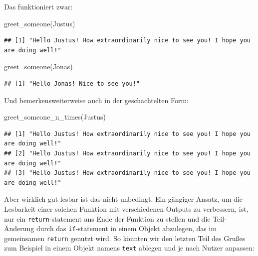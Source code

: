 \documentclass[
]{book}
\newenvironment{Shaded}{\begin{snugshade}}{\end{snugshade}}
\newcommand{\FunctionTok}[1]{\textcolor[rgb]{0.00,0.00,0.00}{#1}}
\newcommand{\NormalTok}[1]{#1}
\newcommand{\StringTok}[1]{\textcolor[rgb]{0.31,0.60,0.02}{#1}}
\begin{document}
Das funktioniert zwar:

\begin{Shaded}
\begin{Highlighting}[]
\FunctionTok{greet\_someone}\NormalTok{(}\StringTok{\textquotesingle{}Justus\textquotesingle{}}\NormalTok{)}
\end{Highlighting}
\end{Shaded}

\begin{verbatim}
## [1] "Hello Justus! How extraordinarily nice to see you! I hope you are doing well!"
\end{verbatim}

\begin{Shaded}
\begin{Highlighting}[]
\FunctionTok{greet\_someone}\NormalTok{(}\StringTok{\textquotesingle{}Jonas\textquotesingle{}}\NormalTok{)}
\end{Highlighting}
\end{Shaded}

\begin{verbatim}
## [1] "Hello Jonas! Nice to see you!"
\end{verbatim}

Und bemerkensweiterweise auch in der geschachtelten Form:

\begin{Shaded}
\begin{Highlighting}[]
\FunctionTok{greet\_someone\_n\_times}\NormalTok{(}\StringTok{\textquotesingle{}Justus\textquotesingle{}}\NormalTok{)}
\end{Highlighting}
\end{Shaded}

\begin{verbatim}
## [1] "Hello Justus! How extraordinarily nice to see you! I hope you are doing well!"
## [2] "Hello Justus! How extraordinarily nice to see you! I hope you are doing well!"
## [3] "Hello Justus! How extraordinarily nice to see you! I hope you are doing well!"
\end{verbatim}

Aber wirklich gut lesbar ist das nicht unbedingt.
Ein gängiger Ansatz, um die Lesbarkeit einer solchen Funktion mit verschiedenen Outputs zu verbessern, ist, nur ein \texttt{return}-statement ans Ende der Funktion zu stellen und die Teil-Änderung durch das \texttt{if}-statement in einem Objekt abzulegen, das im gemeinsamen \texttt{return} genutzt wird. So könnten wir den letzten Teil des Grußes zum Beispiel in einem Objekt namens \texttt{text} ablegen und je nach Nutzer anpassen:
\end{document}
